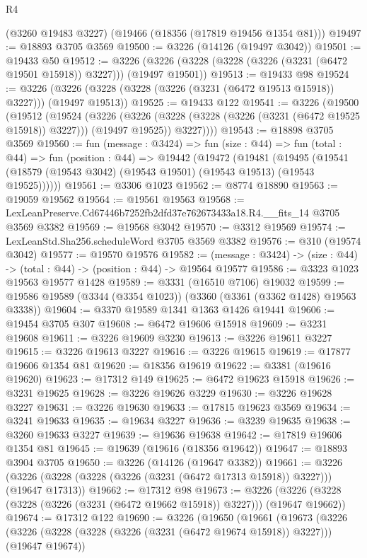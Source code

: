 \begin{lexlean}{R4}
\begin{coremodule}
    (@3260 @19483 @3227)
    (@19466 (@18356 (@17819 @19456 @1354 @81)))
@19497 := @18893 @3705 @3569
@19500 := @3226 (@14126 (@19497 @3042))
@19501 := @19433 @50
@19512 := @3226 (@3226 (@3228 (@3228 (@3226 (@3231 (@6472 @19501 @15918)) @3227))) (@19497 @19501))
@19513 := @19433 @98
@19524 := @3226 (@3226 (@3228 (@3228 (@3226 (@3231 (@6472 @19513 @15918)) @3227))) (@19497 @19513))
@19525 := @19433 @122
@19541 := @3226
    (@19500
      (@19512
        (@19524
          (@3226
            (@3226 (@3228 (@3228 (@3226 (@3231 (@6472 @19525 @15918)) @3227))) (@19497 @19525))
            @3227))))
@19543 := @18898 @3705 @3569
@19560 := fun (message : @3424) =>
  fun (size : @44) =>
  fun (total : @44) =>
  fun (position : @44) =>
  @19442
    (@19472
      (@19481
        (@19495 (@19541 (@18579 (@19543 @3042) (@19543 @19501) (@19543 @19513) (@19543 @19525))))))
@19561 := @3306 @1023
@19562 := @8774 @18890
@19563 := @19059 @19562
@19564 := @19561 @19563
@19568 := LexLeanPreserve.Cd67446b7252fb2dfd37e762673433a18.R4.__fits_14 @3705 @3569 @3382
@19569 := @19568 @3042
@19570 := @3312 @19569
@19574 := LexLeanStd.Sha256.scheduleWord @3705 @3569 @3382
@19576 := @310 (@19574 @3042)
@19577 := @19570 @19576
@19582 := (message : @3424) -> (size : @44) -> (total : @44) -> (position : @44) -> @19564 @19577
@19586 := @3323 @1023 @19563 @19577 @1428
@19589 := @3331 (@16510 @7106) @19032
@19599 := @19586 @19589 (@3344 (@3354 @1023)) (@3360 (@3361 (@3362 @1428) @19563 @3338))
@19604 := @3370 @19589 @1341 @1363 @1426 @19441
@19606 := @19454 @3705 @307
@19608 := @6472 @19606 @15918
@19609 := @3231 @19608
@19611 := @3226 @19609 @3230
@19613 := @3226 @19611 @3227
@19615 := @3226 @19613 @3227
@19616 := @3226 @19615
@19619 := @17877 @19606 @1354 @81
@19620 := @18356 @19619
@19622 := @3381 (@19616 @19620)
@19623 := @17312 @149
@19625 := @6472 @19623 @15918
@19626 := @3231 @19625
@19628 := @3226 @19626 @3229
@19630 := @3226 @19628 @3227
@19631 := @3226 @19630
@19633 := @17815 @19623 @3569
@19634 := @3241 @19633
@19635 := @19634 @3227
@19636 := @3239 @19635
@19638 := @3260 @19633 @3227
@19639 := @19636 @19638
@19642 := @17819 @19606 @1354 @81
@19645 := @19639 (@19616 (@18356 @19642))
@19647 := @18893 @3904 @3705
@19650 := @3226 (@14126 (@19647 @3382))
@19661 := @3226 (@3226 (@3228 (@3228 (@3226 (@3231 (@6472 @17313 @15918)) @3227))) (@19647 @17313))
@19662 := @17312 @98
@19673 := @3226 (@3226 (@3228 (@3228 (@3226 (@3231 (@6472 @19662 @15918)) @3227))) (@19647 @19662))
@19674 := @17312 @122
@19690 := @3226
    (@19650
      (@19661
        (@19673
          (@3226
            (@3226 (@3228 (@3228 (@3226 (@3231 (@6472 @19674 @15918)) @3227))) (@19647 @19674))

\end{coremodule}
\end{lexlean}
